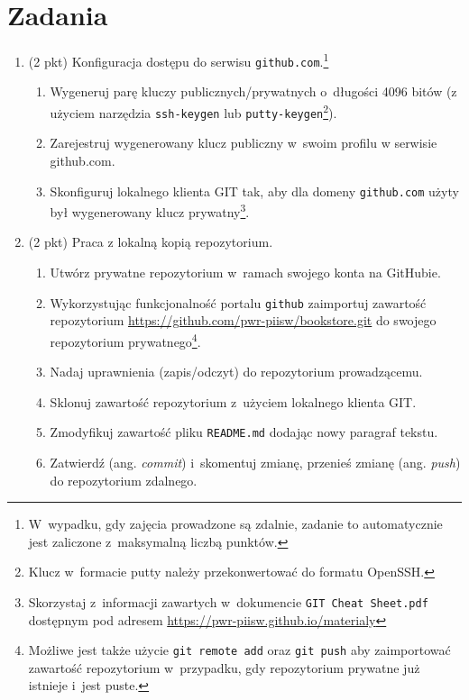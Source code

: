 \documentclass[12pt]{article}
\begin{document}
    \section*{Zadania}
    \begin{enumerate}
        \item\label{exc:github-access}
            (2 pkt) Konfiguracja dostępu do serwisu \texttt{github.com}.\footnote{W~wypadku, gdy zajęcia prowadzone są zdalnie, zadanie to automatycznie jest zaliczone z~maksymalną liczbą punktów.}
            \begin{enumerate}
                \item Wygeneruj parę kluczy publicznych/prywatnych o~długości 4096 bitów (z użyciem narzędzia \texttt{ssh-keygen} lub \texttt{putty-keygen}\footnote{Klucz w~formacie putty należy przekonwertować do formatu OpenSSH.}).
                \item Zarejestruj wygenerowany klucz publiczny w~swoim profilu w serwisie github.com.
                \item Skonfiguruj lokalnego klienta GIT tak, aby dla domeny \texttt{github.com} użyty był wygenerowany klucz prywatny\footnote{Skorzystaj z~informacji zawartych w~dokumencie \texttt{GIT Cheat Sheet.pdf} dostępnym pod adresem \url{https://pwr-piisw.github.io/materialy}}.
            \end{enumerate}

        \item\label{exc:git-repo}
            (2 pkt) Praca z lokalną kopią repozytorium.
            \begin{enumerate}
                \item Utwórz prywatne repozytorium w~ramach swojego konta na GitHubie.
                \item Wykorzystując funkcjonalność portalu \texttt{github} zaimportuj zawartość repozytorium \url{https://github.com/pwr-piisw/bookstore.git} do swojego repozytorium prywatnego\footnote{Możliwe jest także użycie \texttt{git remote add} oraz \texttt{git push} aby zaimportować zawartość repozytorium w~przypadku, gdy repozytorium prywatne już istnieje i~jest puste.}.
                \item Nadaj uprawnienia (zapis/odczyt) do repozytorium prowadzącemu.
                \item Sklonuj zawartość repozytorium z~użyciem lokalnego klienta GIT.
                \item Zmodyfikuj zawartość pliku \texttt{README.md} dodając nowy paragraf tekstu.
                \item Zatwierdź (ang. \textit{commit}) i~skomentuj zmianę, przenieś zmianę (ang. \textit{push}) do repozytorium zdalnego.
            \end{enumerate}


\end{enumerate}
\end{document}
